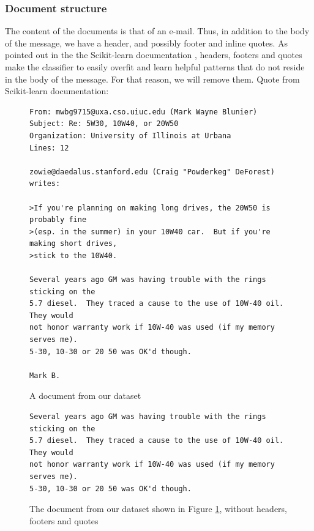 \documentclass[10pt,journal,compsoc, onecolumn]{IEEEtran}
\begin{document}
\subsubsection{Document structure}

The content of the documents is that of an e-mail. Thus, in addition to the body of the message, we have a header, and possibly footer and inline quotes. As pointed out in the the Scikit-learn documentation \cite{Sklearn}, headers, footers and quotes make the classifier to easily overfit and learn helpful patterns that do not reside in the body of the message. For that reason, we will remove them. Quote from Scikit-learn documentation:


\begin{figure}[h]
\caption{A document from our dataset}
\begin{verbatim}
From: mwbg9715@uxa.cso.uiuc.edu (Mark Wayne Blunier)
Subject: Re: 5W30, 10W40, or 20W50
Organization: University of Illinois at Urbana
Lines: 12

zowie@daedalus.stanford.edu (Craig "Powderkeg" DeForest) writes:

>If you're planning on making long drives, the 20W50 is probably fine
>(esp. in the summer) in your 10W40 car.  But if you're making short drives,
>stick to the 10W40.

Several years ago GM was having trouble with the rings sticking on the
5.7 diesel.  They traced a cause to the use of 10W-40 oil.  They would
not honor warranty work if 10W-40 was used (if my memory serves me).
5-30, 10-30 or 20 50 was OK'd though.

Mark B.
\end{verbatim}
\label{doc1}
\end{figure}

\begin{figure}[h]
\caption{The document from our dataset shown in Figure \ref{doc1}, without headers, footers and quotes}
\begin{verbatim}
Several years ago GM was having trouble with the rings sticking on the
5.7 diesel.  They traced a cause to the use of 10W-40 oil.  They would
not honor warranty work if 10W-40 was used (if my memory serves me).
5-30, 10-30 or 20 50 was OK'd though.
\end{verbatim}
\label{doc2}
\end{figure}
\end{document}
